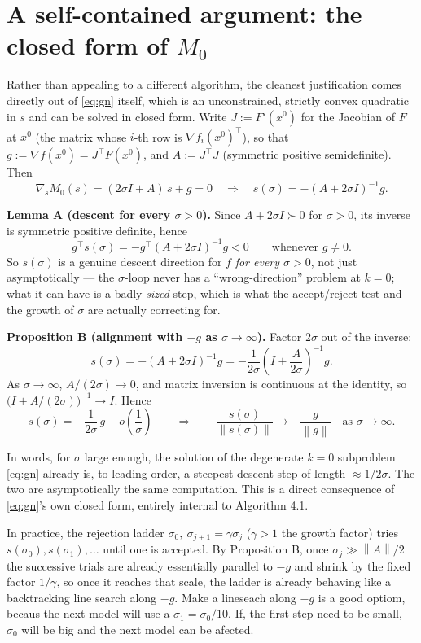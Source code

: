 \documentclass[11pt]{article}
\newcommand{\norm}[1]{\left\lVert #1 \right\rVert}
\begin{document}
\section{A self-contained argument: the closed form of $M_0$}
\label{sec:closedform}

Rather than appealing to a different algorithm, the cleanest justification
comes directly out of \eqref{eq:gn} itself, which is an unconstrained,
strictly convex quadratic in $s$ and can be solved in closed form. Write
$J:=F'(x^0)$ for the Jacobian of $F$ at $x^0$ (the matrix whose $i$-th row
is $\nabla f_i(x^0)^\top$), so that $g:=\nabla f(x^0)=J^\top F(x^0)$, and
$A:=J^\top J$ (symmetric positive semidefinite). Then
\[
    \nabla_s M_0(s) = (2\sigma I + A)\,s + g = 0
    \quad\Longrightarrow\quad
    s(\sigma) = -(A+2\sigma I)^{-1} g.
\]

\textbf{Lemma A (descent for every $\sigma>0$).} Since $A+2\sigma I \succ
0$ for $\sigma>0$, its inverse is symmetric positive definite, hence
\[
    g^\top s(\sigma) = -g^\top (A+2\sigma I)^{-1} g < 0 \qquad \text{whenever } g\ne0.
\]
So $s(\sigma)$ is a genuine descent direction for $f$ \emph{for every
$\sigma>0$}, not just asymptotically --- the $\sigma$-loop never has a
``wrong-direction'' problem at $k=0$; what it can have is a
badly-\emph{sized} step, which is what the accept/reject test and the
growth of $\sigma$ are actually correcting for.

\textbf{Proposition B (alignment with $-g$ as $\sigma\to\infty$).} Factor
$2\sigma$ out of the inverse:
\[
    s(\sigma) = -(A+2\sigma I)^{-1}g
    = -\frac{1}{2\sigma}\left(I + \frac{A}{2\sigma}\right)^{-1}g.
\]
As $\sigma\to\infty$, $A/(2\sigma)\to0$, and matrix inversion is
continuous at the identity, so $\bigl(I+A/(2\sigma)\bigr)^{-1}\to I$.
Hence
\begin{equation}
    s(\sigma) = -\frac{1}{2\sigma}\,g + o\!\left(\frac1\sigma\right)
    \qquad\Longrightarrow\qquad
    \frac{s(\sigma)}{\norm{s(\sigma)}} \longrightarrow -\frac{g}{\norm{g}}
    \quad\text{as } \sigma\to\infty.
    \label{eq:asymptotic}
\end{equation}

In words, for $\sigma$ large enough, the solution of the degenerate
$k=0$ subproblem \eqref{eq:gn} already is, to leading order, a
steepest-descent step of length $\approx1/2\sigma$. The two are
asymptotically the same computation. This is a direct consequence of
\eqref{eq:gn}'s own closed form, entirely internal to Algorithm 4.1.

In practice, the rejection ladder $\sigma_0,\ \sigma_{j+1}=\gamma\sigma_j$
($\gamma>1$ the growth factor) tries $s(\sigma_0), s(\sigma_1),\dots$
until one is accepted. By Proposition B, once $\sigma_j\gg\norm{A}/2$ the
successive trials are already essentially parallel to $-g$ and shrink by
the fixed factor $1/\gamma$, so once it reaches that scale, the ladder
is already behaving like a backtracking line search along $-g$. Make a lineseach along $-g$ is a good optiom, becaus the next model will use a $\sigma_1 = \sigma_0/10$. If, the first step need to be small, $\sigma_0$ will be big and the next model can be afected. 
\end{document}

